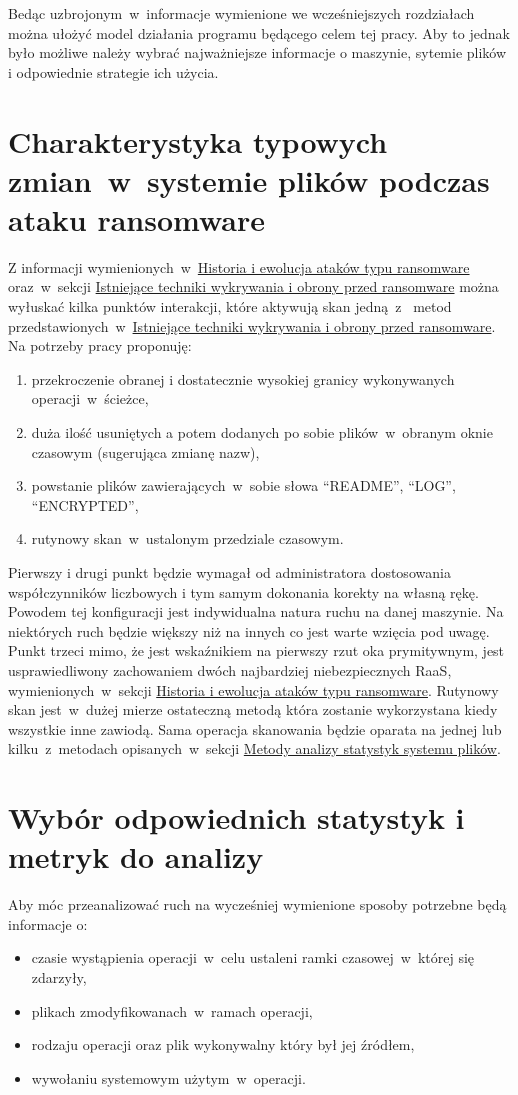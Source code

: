 Bedąc uzbrojonym~w~informacje wymienione we wcześniejszych rozdziałach można ułożyć model działania programu będącego celem tej pracy. Aby to jednak było możliwe należy wybrać najważniejsze informacje o maszynie, sytemie plików i odpowiednie strategie ich użycia.

\section{Charakterystyka typowych zmian~w~systemie plików podczas ataku ransomware}
Z informacji wymienionych~w~\hyperref[sec:monitorowanie]{Historia i ewolucja ataków typu ransomware} oraz~w~sekcji
\hyperref[sec:techniques]{Istniejące techniki wykrywania i obrony przed ransomware} można wyłuskać kilka punktów interakcji, które aktywują skan jedną~z~ metod przedstawionych~w~\hyperref[sec:techniques]{Istniejące techniki wykrywania i obrony przed ransomware}. Na potrzeby pracy proponuję: 
\begin{enumerate}
    \item przekroczenie obranej i dostatecznie wysokiej granicy wykonywanych operacji~w~ścieżce,
    \item duża ilość usuniętych a potem dodanych po sobie plików~w~obranym oknie czasowym (sugerująca zmianę nazw),
    \item powstanie plików zawierających~w~sobie słowa \enquote{README}, \enquote{LOG}, \enquote{ENCRYPTED},
    \item rutynowy skan~w~ustalonym przedziale czasowym.
\end{enumerate}
Pierwszy i drugi punkt będzie wymagał od administratora dostosowania współczynników liczbowych i tym samym dokonania korekty na własną rękę. Powodem tej konfiguracji jest indywidualna natura ruchu na danej maszynie. Na niektórych ruch będzie większy niż na innych co jest warte wzięcia pod uwagę. Punkt trzeci mimo, że jest wskaźnikiem na pierwszy rzut oka prymitywnym, jest usprawiedliwony zachowaniem dwóch najbardziej niebezpiecznych RaaS, wymienionych~w~sekcji \hyperref[sec:monitorowanie]{Historia i ewolucja ataków typu ransomware}. Rutynowy skan jest~w~dużej mierze ostateczną metodą która zostanie wykorzystana kiedy wszystkie inne zawiodą. Sama operacja skanowania będzie oparata na jednej lub kilku~z~metodach opisanych~w~sekcji \hyperref[sec:metody]{Metody analizy statystyk systemu plików}.
\newpage
\section{Wybór odpowiednich statystyk i metryk do analizy}
\label{sec:wybor}
Aby móc przeanalizować ruch na wycześniej wymienione sposoby potrzebne będą informacje o:
\begin{itemize}
    \item czasie wystąpienia operacji~w~celu ustaleni ramki czasowej~w~której się zdarzyły,
    \item plikach zmodyfikowanach~w~ramach operacji,
    \item rodzaju operacji oraz plik wykonywalny który był jej źródłem,
    \item wywołaniu systemowym użytym~w~operacji.
\end{itemize}

